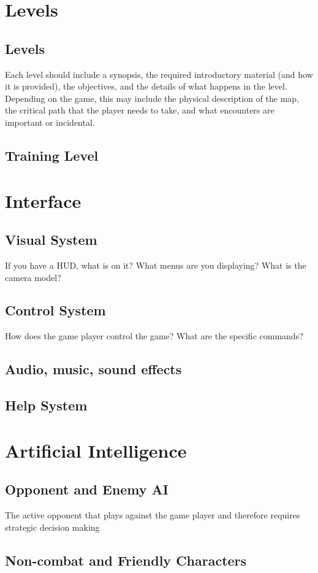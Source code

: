 \documentclass[12pt, letterpaper]{article}
\begin{document}
\section{Levels}
    \subsection{Levels}
    Each level should include a synopsis, the required introductory material (and how it is provided), the objectives, and the details of what happens in the level.  Depending on the game, this may include the physical description of the map, the critical path that the player needs to take, and what encounters are important or incidental.
    \subsection{Training Level}
\section{Interface}
    \subsection{Visual System}
    If you have a HUD, what is on it?  What menus are you displaying? What is the camera model?
    \subsection{Control System}
    How does the game player control the game?   What are the specific commands?
    \subsection{Audio, music, sound effects}
    \subsection{Help System}
\section{Artificial Intelligence}
    \subsection{Opponent  and Enemy AI}
    The active opponent that plays against the game player and therefore requires strategic decision making 
    \subsection{Non-combat and Friendly Characters}
\end{document}
